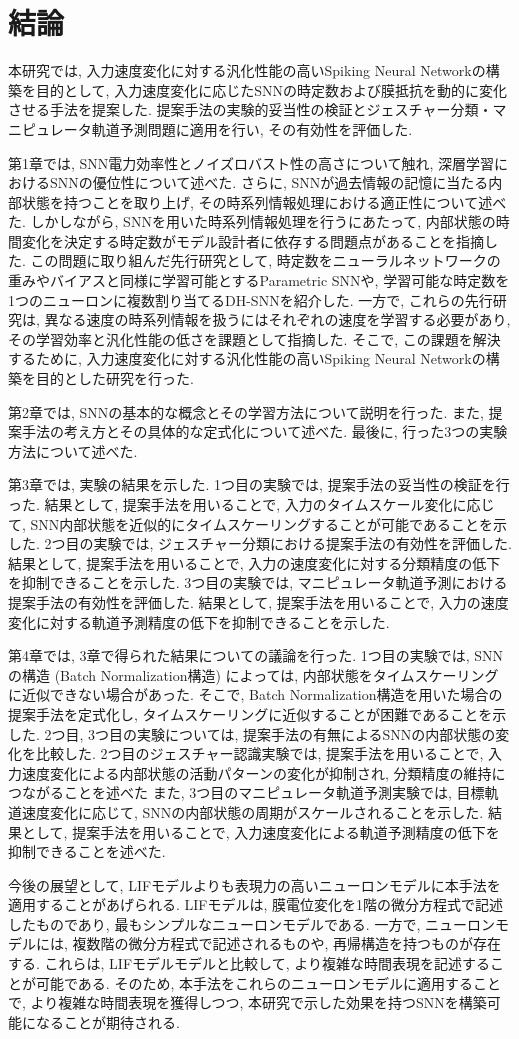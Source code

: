 \cleardoublepage %
\chapter{結論}

本研究では, 入力速度変化に対する汎化性能の高いSpiking Neural Networkの構築を目的として, 入力速度変化に応じたSNNの時定数および膜抵抗を動的に変化させる手法を提案した.
提案手法の実験的妥当性の検証とジェスチャー分類・マニピュレータ軌道予測問題に適用を行い, その有効性を評価した.

第1章では, SNN電力効率性とノイズロバスト性の高さについて触れ, 深層学習におけるSNNの優位性について述べた.
さらに, SNNが過去情報の記憶に当たる内部状態を持つことを取り上げ, その時系列情報処理における適正性について述べた.
しかしながら, SNNを用いた時系列情報処理を行うにあたって, 内部状態の時間変化を決定する時定数がモデル設計者に依存する問題点があることを指摘した.
この問題に取り組んだ先行研究として, 時定数をニューラルネットワークの重みやバイアスと同様に学習可能とするParametric SNNや, 学習可能な時定数を1つのニューロンに複数割り当てるDH-SNNを紹介した.
一方で, これらの先行研究は, 異なる速度の時系列情報を扱うにはそれぞれの速度を学習する必要があり, その学習効率と汎化性能の低さを課題として指摘した.
そこで, この課題を解決するために, 入力速度変化に対する汎化性能の高いSpiking Neural Networkの構築を目的とした研究を行った.

第2章では, SNNの基本的な概念とその学習方法について説明を行った.
また, 提案手法の考え方とその具体的な定式化について述べた.
最後に, 行った3つの実験方法について述べた.

第3章では, 実験の結果を示した.
1つ目の実験では, 提案手法の妥当性の検証を行った.
結果として, 提案手法を用いることで, 入力のタイムスケール変化に応じて, SNN内部状態を近似的にタイムスケーリングすることが可能であることを示した.
2つ目の実験では, ジェスチャー分類における提案手法の有効性を評価した.
結果として, 提案手法を用いることで, 入力の速度変化に対する分類精度の低下を抑制できることを示した.
3つ目の実験では, マニピュレータ軌道予測における提案手法の有効性を評価した.
結果として, 提案手法を用いることで, 入力の速度変化に対する軌道予測精度の低下を抑制できることを示した.

第4章では, 3章で得られた結果についての議論を行った.
1つ目の実験では, SNNの構造 (Batch Normalization構造) によっては, 内部状態をタイムスケーリングに近似できない場合があった.
そこで, Batch Normalization構造を用いた場合の提案手法を定式化し, タイムスケーリングに近似することが困難であることを示した.
2つ目, 3つ目の実験については, 提案手法の有無によるSNNの内部状態の変化を比較した.
2つ目のジェスチャー認識実験では, 提案手法を用いることで, 入力速度変化による内部状態の活動パターンの変化が抑制され, 分類精度の維持につながることを述べた
また, 3つ目のマニピュレータ軌道予測実験では, 目標軌道速度変化に応じて, SNNの内部状態の周期がスケールされることを示した.
結果として, 提案手法を用いることで, 入力速度変化による軌道予測精度の低下を抑制できることを述べた.

今後の展望として, LIFモデルよりも表現力の高いニューロンモデルに本手法を適用することがあげられる.
LIFモデルは, 膜電位変化を1階の微分方程式で記述したものであり, 最もシンプルなニューロンモデルである.
一方で, ニューロンモデルには, 複数階の微分方程式で記述されるものや, 再帰構造を持つものが存在する.
これらは, LIFモデルモデルと比較して, より複雑な時間表現を記述することが可能である.
そのため, 本手法をこれらのニューロンモデルに適用することで, より複雑な時間表現を獲得しつつ, 本研究で示した効果を持つSNNを構築可能になることが期待される.
